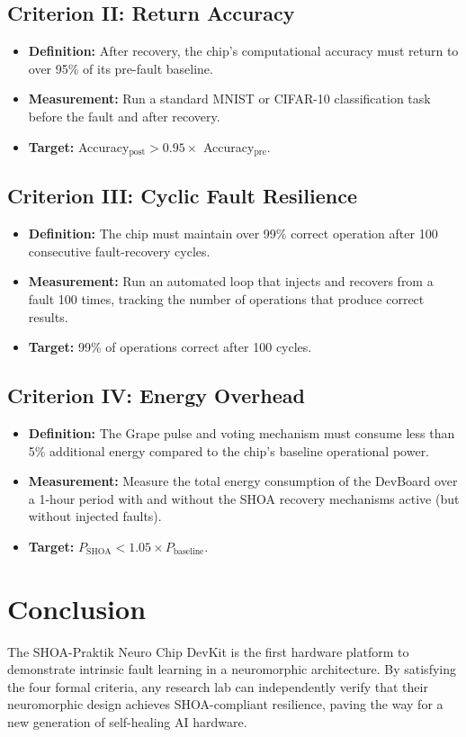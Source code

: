 \documentclass[12pt]{article}
\begin{document}
\subsection{Criterion II: Return Accuracy}
\begin{itemize}
    \item \textbf{Definition:} After recovery, the chip's computational accuracy must return to over 95\% of its pre-fault baseline.
    \item \textbf{Measurement:} Run a standard MNIST or CIFAR-10 classification task before the fault and after recovery.
    \item \textbf{Target:} Accuracy$_{\text{post}} > 0.95 \times$ Accuracy$_{\text{pre}}$.
\end{itemize}

\subsection{Criterion III: Cyclic Fault Resilience}
\begin{itemize}
    \item \textbf{Definition:} The chip must maintain over 99\% correct operation after 100 consecutive fault-recovery cycles.
    \item \textbf{Measurement:} Run an automated loop that injects and recovers from a fault 100 times, tracking the number of operations that produce correct results.
    \item \textbf{Target:} 99\% of operations correct after 100 cycles.
\end{itemize}

\subsection{Criterion IV: Energy Overhead}
\begin{itemize}
    \item \textbf{Definition:} The Grape pulse and voting mechanism must consume less than 5\% additional energy compared to the chip's baseline operational power.
    \item \textbf{Measurement:} Measure the total energy consumption of the DevBoard over a 1-hour period with and without the SHOA recovery mechanisms active (but without injected faults).
    \item \textbf{Target:} $P_{\text{SHOA}} < 1.05 \times P_{\text{baseline}}$.
\end{itemize}

\section{Conclusion}
The SHOA-Praktik Neuro Chip DevKit is the first hardware platform to demonstrate intrinsic fault learning in a neuromorphic architecture. By satisfying the four formal criteria, any research lab can independently verify that their neuromorphic design achieves SHOA-compliant resilience, paving the way for a new generation of self-healing AI hardware.
\end{document}
